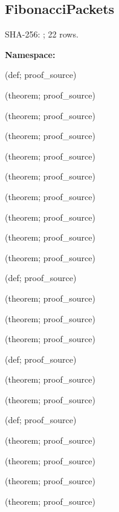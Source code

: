 \subsection*{FibonacciPackets}
{\footnotesize SHA-256: ; 22 rows.}\par
\begingroup\small
\textbf{Namespace:} \par
\noindent{} {\scriptsize (def; proof\_source)}\par
\noindent{} {\scriptsize (theorem; proof\_source)}\par
\noindent{} {\scriptsize (theorem; proof\_source)}\par
\noindent{} {\scriptsize (theorem; proof\_source)}\par
\noindent{} {\scriptsize (theorem; proof\_source)}\par
\noindent{} {\scriptsize (theorem; proof\_source)}\par
\noindent{} {\scriptsize (theorem; proof\_source)}\par
\noindent{} {\scriptsize (theorem; proof\_source)}\par
\noindent{} {\scriptsize (theorem; proof\_source)}\par
\noindent{} {\scriptsize (theorem; proof\_source)}\par
\noindent{} {\scriptsize (def; proof\_source)}\par
\noindent{} {\scriptsize (theorem; proof\_source)}\par
\noindent{} {\scriptsize (theorem; proof\_source)}\par
\noindent{} {\scriptsize (theorem; proof\_source)}\par
\noindent{} {\scriptsize (def; proof\_source)}\par
\noindent{} {\scriptsize (theorem; proof\_source)}\par
\noindent{} {\scriptsize (theorem; proof\_source)}\par
\noindent{} {\scriptsize (def; proof\_source)}\par
\noindent{} {\scriptsize (theorem; proof\_source)}\par
\noindent{} {\scriptsize (theorem; proof\_source)}\par
\noindent{} {\scriptsize (theorem; proof\_source)}\par
\noindent{} {\scriptsize (theorem; proof\_source)}\par
\endgroup
